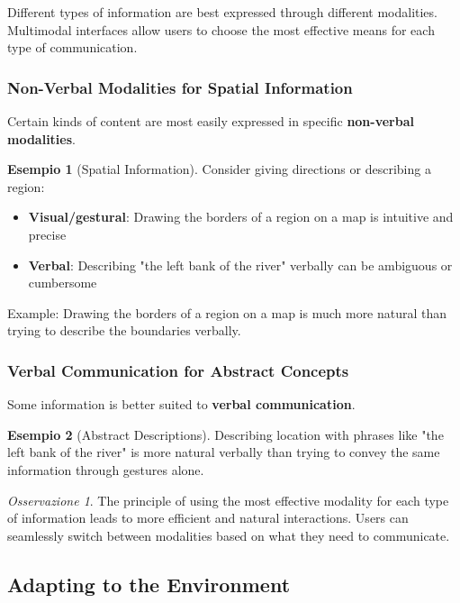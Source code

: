 \documentclass[11pt,a4paper]{article}
\theoremstyle{definition}
\newtheorem{example}{Esempio}[section]
\theoremstyle{plain}
\theoremstyle{remark}
\newtheorem*{observation}{Osservazione}
\begin{document}
Different types of information are best expressed through different modalities. Multimodal interfaces allow users to choose the most effective means for each type of communication.

\subsubsection{Non-Verbal Modalities for Spatial Information}

Certain kinds of content are most easily expressed in specific \textbf{non-verbal modalities}.

\begin{example}[Spatial Information]
Consider giving directions or describing a region:
\begin{itemize}
    \item \textbf{Visual/gestural}: Drawing the borders of a region on a map is intuitive and precise
    \item \textbf{Verbal}: Describing "the left bank of the river" verbally can be ambiguous or cumbersome
\end{itemize}

Example: Drawing the borders of a region on a map is much more natural than trying to describe the boundaries verbally.
\end{example}

\subsubsection{Verbal Communication for Abstract Concepts}

Some information is better suited to \textbf{verbal communication}.

\begin{example}[Abstract Descriptions]
Describing location with phrases like "the left bank of the river" is more natural verbally than trying to convey the same information through gestures alone.
\end{example}

\begin{observation}
The principle of using the most effective modality for each type of information leads to more efficient and natural interactions. Users can seamlessly switch between modalities based on what they need to communicate.
\end{observation}

\subsection{Adapting to the Environment}
\end{document}
